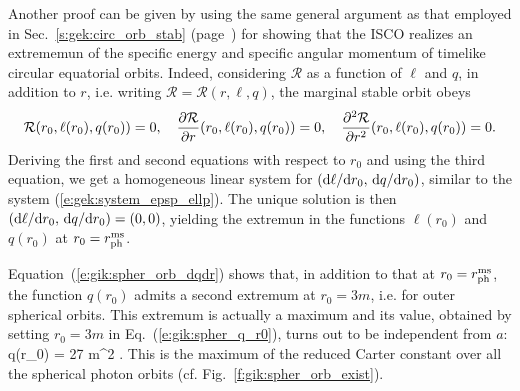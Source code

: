 \begin{remark}
Another proof can be given by using the same general argument as that employed in
Sec.~\ref{s:gek:circ_orb_stab} (page~\pageref{p:gek:ISCO_extremum_eps_ell})
for showing that the ISCO realizes an extrememun of the specific energy
and specific angular momentum of timelike circular equatorial orbits.
Indeed, considering $\mathcal{R}$ as a function of $\ell$ and $q$, in addition
to $r$, i.e. writing $\mathcal{R} = \mathcal{R}(r, \ell, q)$, the marginal
stable orbit obeys
\[
    \mathcal{R}(r_0, \ell(r_0), q(r_0)) = 0,\quad
    \frac{\partial \mathcal{R}}{\partial r}(r_0, \ell(r_0), q(r_0)) = 0,\quad
    \frac{\partial^2\mathcal{R}}{\partial r^2} (r_0, \ell(r_0), q(r_0)) = 0 .
\]
Deriving the first and second equations with respect to $r_0$
and using the third equation, we get a homogeneous linear
system for $(\mathrm{d}\ell/\mathrm{d} r_0,\, \mathrm{d} q/\mathrm{d} r_0)$, similar to the
system (\ref{e:gek:system_epsp_ellp}). The unique solution
is then $(\mathrm{d}\ell/\mathrm{d} r_0,\, \mathrm{d} q/\mathrm{d} r_0) = (0, 0)$, yielding the extremun in the
functions $\ell(r_0)$ and $q(r_0)$ at $r_0 = r_{\rm ph}^{\rm ms}$.
\end{remark}

Equation~(\ref{e:gik:spher_orb_dqdr}) shows that, in addition to that
at $r_0 = r_{\rm ph}^{\rm ms}$, the function $q(r_0)$ admits
a second extremum at $r_0 = 3m$, i.e. for outer spherical orbits.
This extremum is actually a maximum and its value, obtained by
setting $r_0 = 3 m$ in Eq.~(\ref{e:gik:spher_q_r0}),
turns out to be independent from $a$:
\be \label{e:gik:spher_max_q}
    \max q(r_0) = 27 m^2 .
\ee
This is the maximum of the reduced Carter constant over all the spherical photon
orbits (cf. Fig.~\ref{f:gik:spher_orb_exist}).


